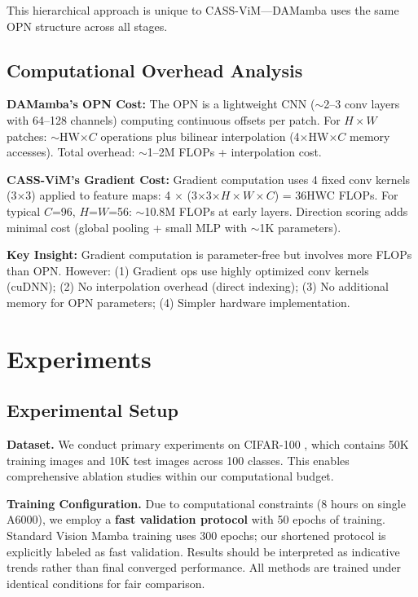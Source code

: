 \documentclass{article}
\begin{document}
This hierarchical approach is unique to CASS-ViM---DAMamba uses the same OPN structure across all stages.

\subsection{Computational Overhead Analysis}

\textbf{DAMamba's OPN Cost:} The OPN is a lightweight CNN ($\sim$2--3 conv layers with 64--128 channels) computing continuous offsets per patch. For $H \times W$ patches: $\sim$HW$\times C$ operations plus bilinear interpolation (4$\times$HW$\times C$ memory accesses). Total overhead: $\sim$1--2M FLOPs + interpolation cost.

\textbf{CASS-ViM's Gradient Cost:} Gradient computation uses 4 fixed conv kernels (3$\times$3) applied to feature maps: 4 $\times$ (3$\times$3$\times H \times W \times C$) = 36HWC FLOPs. For typical $C$=96, $H$=$W$=56: $\sim$10.8M FLOPs at early layers. Direction scoring adds minimal cost (global pooling + small MLP with $\sim$1K parameters).

\textbf{Key Insight:} Gradient computation is parameter-free but involves more FLOPs than OPN. However: (1) Gradient ops use highly optimized conv kernels (cuDNN); (2) No interpolation overhead (direct indexing); (3) No additional memory for OPN parameters; (4) Simpler hardware implementation.

\section{Experiments}
\label{sec:experiments}

\subsection{Experimental Setup}

\textbf{Dataset.} We conduct primary experiments on CIFAR-100 \cite{krizhevsky2009learning}, which contains 50K training images and 10K test images across 100 classes. This enables comprehensive ablation studies within our computational budget.

\textbf{Training Configuration.} Due to computational constraints (8 hours on single A6000), we employ a \textbf{fast validation protocol} with 50 epochs of training. Standard Vision Mamba training uses 300 epochs; our shortened protocol is explicitly labeled as fast validation. Results should be interpreted as indicative trends rather than final converged performance. All methods are trained under identical conditions for fair comparison.
\end{document}
